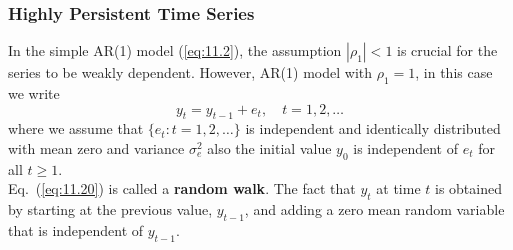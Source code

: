 \documentclass[a4paper, 10pt]{article}
\theoremstyle{definition}	%
\begin{document}
\subsubsection{Highly Persistent Time Series}
In the simple AR(1) model (\ref{eq:11.2}), the assumption \( |\rho_1| < 1 \) is crucial for the series to be weakly dependent. However, AR(1) model with \( \rho_1 = 1 \), in this case we write
\begin{equation}
y_t = y_{t-1} + e_t, \quad t = 1, 2, \ldots
\label{eq:11.20}
\end{equation}
where we assume that \( \{ e_t : t = 1, 2, \ldots \} \) is independent and identically distributed with mean zero and variance \( \sigma_e^2 \) also the initial value \( y_0 \) is independent of \( e_t \) for all \( t \ge 1 \).\\
Eq.~(\ref{eq:11.20}) is called a \textbf{random walk}. The fact that \( y_t \) at time \( t \) is obtained by starting at the previous value, \( y_{t-1} \), and adding a zero mean random variable that is independent of \( y_{t-1} \).
\end{document}
